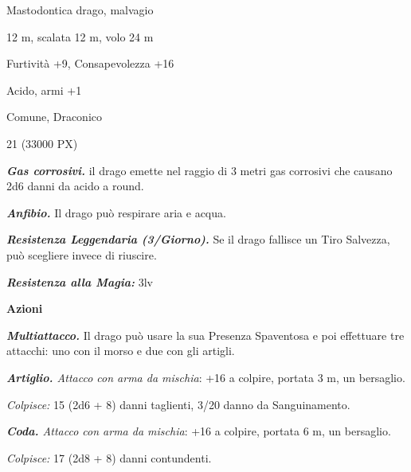 \begin{multicols}{2}
{
\begin{description}[noitemsep, topsep=0pt, parsep=0pt, partopsep=0pt, itemsep=1pt, leftmargin=2.35cm,  labelwidth=2.2cm, itemindent=0cm, listparindent=0pt] %
\setlength{\baselineskip}{10pt}
\item[\textbf{Taglia/Tipo}] Mastodontica drago, malvagio
\item[\textbf{Caratt.}] 
\item[\textbf{Punti Ferita}] 
\item[\textbf{Movimento}] 12 m, scalata 12 m, volo 24 m
\item[\textbf{Tiri Salvez.}] 
\item[\textbf{Comp.}] Furtività +9, Consapevolezza +16
\item[\textbf{Imm. Danni}] Acido, armi +1
\item[\textbf{Sensi}] 
\item[\textbf{Linguaggi}] Comune, Draconico
\item[\textbf{Sfida}] 21 (33000 PX)
\end{description}
\smallskip

\emph{\textbf{Gas corrosivi.}} il drago emette nel raggio di 3 metri gas corrosivi che causano 2d6 danni da acido a round.

\emph{\textbf{Anfibio.}} Il drago può respirare aria e acqua.

\emph{\textbf{Resistenza Leggendaria (3/Giorno).}} Se il drago fallisce un Tiro Salvezza, può scegliere invece di riuscire.

\emph{\textbf{Resistenza alla Magia:}} 3lv

\textbf{Azioni}

\emph{\textbf{Multiattacco.}} Il drago può usare la sua Presenza Spaventosa e poi effettuare tre attacchi: uno con il morso e due con gli artigli.

\emph{\textbf{Artiglio.} Attacco con arma da mischia}: +16 a colpire, portata 3 m, un bersaglio.

\emph{Colpisce:} 15 (2d6 + 8) danni taglienti, 3/20 danno da Sanguinamento.

\emph{\textbf{Coda.} Attacco con arma da mischia}: +16 a colpire, portata 6 m, un bersaglio.

\emph{Colpisce:} 17 (2d8 + 8) danni contundenti.

}
\end{multicols}

